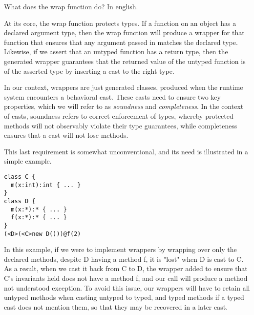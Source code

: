 \documentclass[a4paper,UKenglish,final]{tex/lipics-v2016}
\begin{document}
\begin{mathpar}
\end{mathpar}

What does the wrap function do? In english.

At its core, the wrap function protects types. If a function on an object has a declared argument type, then the wrap function will produce a wrapper for that function that ensures that any argument passed in matches the declared type. Likewise, if we assert that an untyped function has a return type, then the generated wrapper guarantees that the returned value of the untyped function is of the asserted type by inserting a cast to the right type.

In our context, wrappers are just generated classes, produced when the runtime system encounters a behavioral cast. These casts need to ensure two key properties, which we will refer to as \emph{soundness} and \emph{completeness}. In the context of casts, soundness refers to correct enforcement of types, whereby protected methods will not observably violate their type guarantees, while completeness ensures that a cast will not lose methods.

This last requirement is somewhat unconventional, and its need is illustrated in a simple example. 

\begin{verbatim}
class C {
  m(x:int):int { ... }
}
class D {
  m(x:*):* { ... }
  f(x:*):* { ... }
}
(<D>(<C>new D()))@f(2)
\end{verbatim}

In this example, if we were to implement wrappers by wrapping over only the declared methods, despite D having a method f, it is "lost" when D is cast to C. As a result, when we cast it back from C to D, the wrapper added to ensure that C's invariants held does not have a method f, and our call will produce a method not understood exception. To avoid this issue, our wrappers will have to retain all untyped methods when casting untyped to typed, and typed methods if a typed cast does not mention them, so that they may be recovered in a later cast.

\hrulefill
\end{document}
